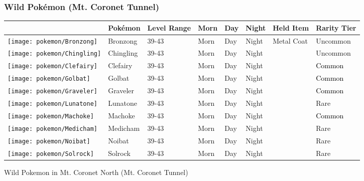 \subsubsection{Wild Pokémon (Mt. Coronet Tunnel)}%
\label{ssubsec:WildPokmon(Mt.CoronetTunnel)}%
\begin{longtable}{||l l l l l l l l||}%
\hline%
\rowcolor{gray}%
&Pokémon&Level Range&Morn&Day&Night&Held Item&Rarity Tier\\%
\hline%
\endhead%
\hline%
\rowcolor{gray}%
\texttt{[image: pokemon/Bronzong]}&Bronzong&39{-}43&Morn&Day&Night&Metal Coat&\textcolor{OliveGreen}{%
Uncommon%
}\\%
\hline%
\rowcolor{gray}%
\texttt{[image: pokemon/Chingling]}&Chingling&39{-}43&Morn&Day&Night&&\textcolor{OliveGreen}{%
Uncommon%
}\\%
\hline%
\rowcolor{gray}%
\texttt{[image: pokemon/Clefairy]}&Clefairy&39{-}43&Morn&Day&Night&&\textcolor{black}{%
Common%
}\\%
\hline%
\rowcolor{gray}%
\texttt{[image: pokemon/Golbat]}&Golbat&39{-}43&Morn&Day&Night&&\textcolor{black}{%
Common%
}\\%
\hline%
\rowcolor{gray}%
\texttt{[image: pokemon/Graveler]}&Graveler&39{-}43&Morn&Day&Night&&\textcolor{black}{%
Common%
}\\%
\hline%
\rowcolor{gray}%
\texttt{[image: pokemon/Lunatone]}&Lunatone&39{-}43&Morn&Day&Night&&\textcolor{RedOrange}{%
Rare%
}\\%
\hline%
\rowcolor{gray}%
\texttt{[image: pokemon/Machoke]}&Machoke&39{-}43&Morn&Day&Night&&\textcolor{black}{%
Common%
}\\%
\hline%
\rowcolor{gray}%
\texttt{[image: pokemon/Medicham]}&Medicham&39{-}43&Morn&Day&Night&&\textcolor{RedOrange}{%
Rare%
}\\%
\hline%
\rowcolor{gray}%
\texttt{[image: pokemon/Noibat]}&Noibat&39{-}43&Morn&Day&Night&&\textcolor{RedOrange}{%
Rare%
}\\%
\hline%
\rowcolor{gray}%
\texttt{[image: pokemon/Solrock]}&Solrock&39{-}43&Morn&Day&Night&&\textcolor{RedOrange}{%
Rare%
}\\%
\hline%
\end{longtable}%
\caption{Wild Pokemon in Mt. Coronet North (Mt. Coronet Tunnel)}